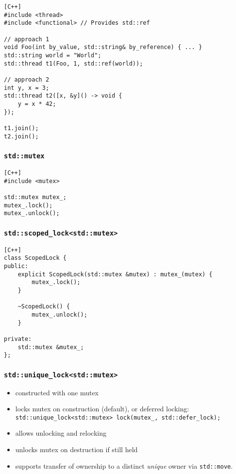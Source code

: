 \documentclass[twocolumn,landscape,10pt]{article}
\theoremstyle{definition}
\begin{document}
\begin{lstlisting}[C++]
#include <thread>
#include <functional> // Provides std::ref

// approach 1
void Foo(int by_value, std::string& by_reference) { ... }
std::string world = "World";
std::thread t1(Foo, 1, std::ref(world));

// approach 2
int y, x = 3;
std::thread t2([x, &y]() -> void {
    y = x * 42;
});

t1.join();
t2.join();
\end{lstlisting}

\subsubsection{\texttt{std::mutex}}

\begin{lstlisting}[C++]
#include <mutex>

std::mutex mutex_;
mutex_.lock();
mutex_.unlock();
\end{lstlisting}

\subsubsection{\texttt{std::scoped\_lock<std::mutex>}}

\begin{lstlisting}[C++]
class ScopedLock {
public:
    explicit ScopedLock(std::mutex &mutex) : mutex_(mutex) {
        mutex_.lock();
    }

    ~ScopedLock() {
        mutex_.unlock();
    }

private:
    std::mutex &mutex_;
};
\end{lstlisting}

\subsubsection{\texttt{std::unique\_lock<std::mutex>}}

\begin{itemize}
    \item constructed with one mutex
    \item locks mutex on construction (default), or deferred locking:
        \\\texttt{std::unique\_lock<std::mutex> lock(mutex\_, std::defer\_lock);}
    \item allows unlocking and relocking
    \item unlocks mutex on destruction if still held
    \item supports transfer of ownership to a distinct \emph{unique} 
        owner via \texttt{std::move}.
\end{itemize} 
\end{document}
